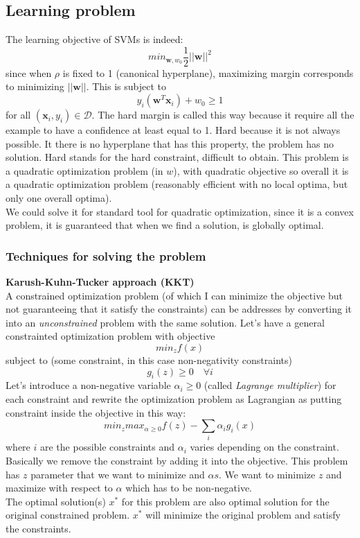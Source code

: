 \subsection{Learning problem}
The learning objective of SVMs is indeed:
\begin{equation}
	min_{\pmb{w}, w_0}\frac{1}{2}||\pmb{w}||^{2}
\end{equation}
since when $\rho$ is fixed to 1 (canonical hyperplane), maximizing margin
corresponds to minimizing $||\pmb{w}||$. This is subject to
\[
	y_{i}(\pmb{w}^{T}\pmb{x}_{i}) + w_{0}\geq 1
\]
for all $(\pmb{x}_{i}, y_{i}) \in \mathcal{D}$. The hard margin is called this
way because it require all the example to have a confidence at least equal to 1.
Hard because it is not always possible. It there is no hyperplane that has this property,
the problem has no solution. Hard stands for the hard constraint, difficult to
obtain. This problem is a quadratic optimization problem (in $w$), with
quadratic objective so overall it is a quadratic optimization problem (reasonably
efficient with no local optima, but only one overall optima).\\ We could solve it
for standard tool for quadratic optimization, since it is a convex problem, it is
guaranteed that when we find a solution, is globally optimal.

\subsubsection{Techniques for solving the problem}
\textbf{Karush-Kuhn-Tucker approach (KKT)}\\ A constrained optimization problem
(of which I can minimize the objective but not guaranteeing that it satisfy the constraints)
can be addresses by converting it into an \textit{unconstrained} problem with the
same solution. Let's have a general constrainted optimization problem with
objective
\[
	min_{z}f(x)
\]
subject to (some constraint, in this case non-negativity constraints)
\[
	g_{i}(z) \geq 0 \quad \forall i
\]
Let's introduce a non-negative variable $\alpha_{i}\geq 0$ (called \textit{Lagrange
multiplier}) for each constraint and rewrite the optimization problem as
Lagrangian as putting constraint inside the objective in this way:
\[
	min_{z}max_{\alpha \geq 0}f(z) - \sum_{i}\alpha_{i}g_{i}(x)
\]
where $i$ are the possible constraints and $\alpha_{i}$ varies depending on the constraint.
Basically we remove the constraint by adding it into the objective. This problem
has $z$ parameter that we want to minimize and $\alpha s$. We want to minimize
$z$ and maximize with respect to $\alpha$ which has to be non-negative. \\ The optimal
solution(s) $x^{*}$ for this problem are also optimal solution for the original
constrained problem. $x^{*}$ will minimize the original problem and satisfy the constraints.\\

